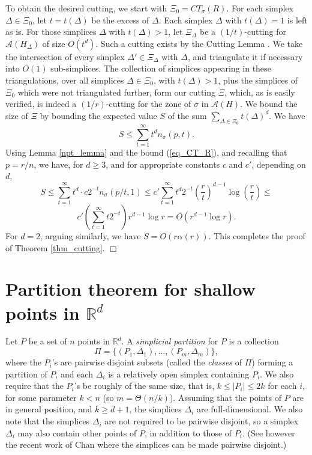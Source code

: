 \documentclass[11pt]{article}
\def\reals{\mathbb R}
\begin{document}
To obtain the desired cutting, we start with $\Xi_{0} = CT_{\sigma}(R)$. For each simplex $\Delta \in \Xi_{0}$, let $t = t(\Delta)$ be the excess of $\Delta$. Each simplex $\Delta$ with $t(\Delta) = 1$ is left as is. For those simplices $\Delta$ with $t(\Delta) > 1$, let $\Xi_{\Delta}$ be a $(1/t)$-cutting for $\mathcal{A}(H_{\Delta})$ of size $O(t^{d})$. Such a cutting exists by the Cutting Lemma \cite{mat02}. We take the intersection of every simplex $\Delta ' \in \Xi_{\Delta}$ with $\Delta$, and triangulate it if necessary into $O(1)$ sub-simplices. The collection of simplices appearing in these triangulations, over all simplices $\Delta \in \Xi_{0}$, with $t(\Delta) > 1$, plus the simplices of $\Xi_{0}$ which were not triangulated further, form our cutting $\Xi$, which, as is easily verified, is indeed a $(1/r)$-cutting for the zone of $\sigma$ in $\mathcal{A}(H)$. We bound the size of $\Xi$ by bounding the expected value $S$ of the sum $\sum_{\Delta \in \Xi_{0}}t(\Delta)^{d}$. We have
$$
S \leq \sum_{t=1}^{\infty}t^{d}n_{\sigma}(p,t).
$$
Using Lemma \ref{npt_lemma} and the bound (\ref{eq_CT_R}), and recalling that $p = r/n$, we have, for $d \geq 3$, and for appropriate constants $c$ and $c'$, depending on $d$,
$$
S \leq \sum_{t=1}^{\infty}t^{d}\cdot c 2^{-t}n_{\sigma}(p/t,1) \leq c' \sum_{t=1}^{\infty}t^{d}2^{-t}\left(\frac{r}{t}\right)^{d-1}\log \left(\frac{r}{t}\right) \leq
$$
$$
c' \left(\sum_{t=1}^{\infty}t2^{-t}\right)r^{d-1}\log r = O(r^{d-1}\log r).
$$
For $d = 2$, arguing similarly, we have $S = O(r\alpha(r))$. This completes the proof of Theorem \ref{thm_cutting}. $\Box$




\section{Partition theorem for shallow points in $\reals^d$} \label{section_partition}

Let $P$ be a set of $n$ points in $\reals^d$. A \emph{simplicial partition} for $P$ is a collection $$\Pi = \biggl\{(P_{1},\Delta_{1}), \ldots,(P_{m},\Delta_{m})\biggr\}, $$
where the $P_{i}$'s are pairwise disjoint subsets (called the \emph{classes} of $\Pi$) forming a partition of $P$, and each $\Delta_{i}$ is a relatively open simplex containing $P_{i}$. We also require that the $P_{i}$'s be roughly of the same size, that is, $k \leq |P_{i}| \leq 2k$ for each $i$, for some parameter $k < n$ (so $m = \Theta(n/k)$). Assuming that the points of $P$ are in general position, and $k \geq d+1$, the simplices $\Delta_{i}$ are full-dimensional. We also note that the simplices $\Delta_{i}$ are not required to be pairwise disjoint, so a simplex $\Delta_{i}$ may also contain other points of $P$, in addition to those of $P_{i}$. (See however the recent work of Chan \cite{ch12} where the simplices can be made pairwise disjoint.)
\end{document}
